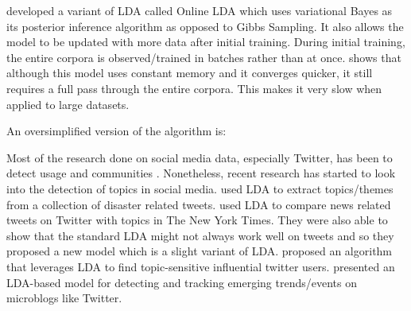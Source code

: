 \citet{hoffman2010online} developed a variant of LDA called Online LDA which uses variational
Bayes as its posterior inference algorithm as opposed to Gibbs Sampling. It also allows the model to
be updated with more data after initial training. During initial training, the entire corpora is
observed/trained in batches rather than at once. \citet{asuncion2009smoothing} shows that although
this model uses constant memory and it converges quicker, it still requires a full pass through the
entire corpora. This makes it very slow when applied to large datasets.

An oversimplified version of the algorithm is:\\
\begin{algorithm}[H]
   {%
  }
\end{algorithm}

Most of the research done on social media data, especially Twitter, has been to detect usage and
communities \citep{java2007we}. Nonetheless, recent research has started to look into the detection
of topics in social media. \citet{kireyev2009applications} used LDA to extract topics/themes from a
collection of disaster related tweets. \citet{zhao2011comparing} used LDA to compare news related
tweets on Twitter with topics in The New York Times. They were also able to show that the standard
LDA might not always work well on tweets and so they proposed a new model which is a slight variant
of LDA. \citet{weng2010twitterrank} proposed an algorithm that leverages LDA to find topic-sensitive
influential twitter users. \citet{lau2012line} presented an LDA-based model for detecting and
tracking emerging trends/events on microblogs like Twitter.

